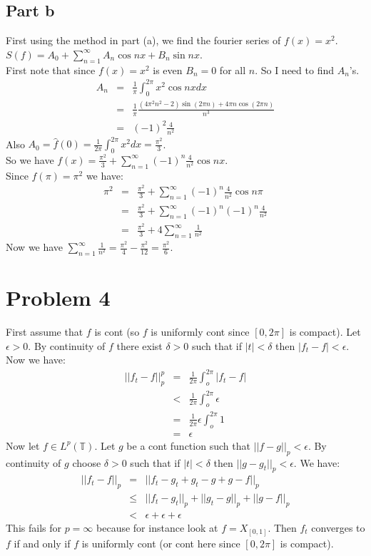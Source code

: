 \documentclass[12pt]{article}
\begin{document}
\subsection*{Part b}
First using the method in part (a), we find the fourier series of $f(x)=x^2$.\\
$S(f)=A_0+\sum_{n=1}^{\infty}A_n\cos nx+ B_n\sin nx$.
\\
First note that since $f(x)=x^2$ is even $B_n=0$ for all $n$.
So I need to find $A_n$'s. \\
\begin{eqnarray*}
A_n &=&\frac{1}{\pi}\int_0^{2\pi} x^2 \cos nx dx \\ &=&
\frac{1}{\pi} \frac{(4\pi^2n^2-2)\sin (2\pi n)+4\pi n\cos (2\pi n)}{n^3} \\ &=&(-1)^2 \frac{4}{n^2}
\end{eqnarray*}
Also $A_0=\hat{f}(0)=\frac{1}{2\pi}\int_0^{2\pi} x^2dx=\frac{ \pi^2}{3}$. \\
So we have $f(x)=\frac{ \pi^2}{3}+\sum_{n=1}^{\infty} (-1)^n\frac{4}{n^2}\cos nx$.\\
Since $f(\pi)=\pi^2$ we have:
\begin{eqnarray*}
\pi^2 &=& \frac{ \pi^2}{3}+\sum_{n=1}^{\infty} (-1)^n\frac{4}{n^2}\cos n\pi
\\ &=&
 \frac{ \pi^2}{3}+\sum_{n=1}^{\infty} (-1)^n(-1)^n\frac{4}{n^2}\\&=&
  \frac{ \pi^2}{3}+4\sum_{n=1}^{\infty} \frac{1}{n^2}
\end{eqnarray*}
Now we have $\sum_{n=1}^{\infty} \frac{1}{n^2}=\frac{\pi^2}{4}-\frac{\pi^2}{12}=\frac{\pi^2}{6}$.

\clearpage
\section*{Problem 4}
First assume that $f$ is cont (so $f$ is uniformly cont since $[0,2\pi]$ is compact). Let $\epsilon > 0$. By continuity of $f$ there exist
$\delta >0$ such that if $|t| < \delta$ then $|f_t-f|< \epsilon$. Now we have:
\begin{eqnarray*}
||f_t-f||_p^p &=& \frac{1}{2\pi}\int_o^{2\pi} |f_t-f|\\ &<&
\frac{1}{2\pi} \int_o^{2\pi} \epsilon \\ &=&
\frac{1}{2\pi} \epsilon \int_o^{2\pi}  1 \\&=& \epsilon
\end{eqnarray*}
Now let $f \in L^p(\mathbb{T})$. Let $g$ be a cont function such that $||f-g||_p < \epsilon$. By continuity of $g$ choose $\delta >0$ such that if $|t|<\delta$ then $||g-g_t||_p < \epsilon$. We have:
\begin{eqnarray*}
||f_t-f||_p &=& ||f_t-g_t+g_t-g+g-f||_p \\ &\le &
||f_t-g_t||_p+||g_t-g||_p+||g-f||_p \\ &<&
\epsilon +\epsilon +\epsilon
\end{eqnarray*}
This fails for $p=\infty$ because for instance look at $f=X_{[0,1]}$. Then $f_t$ converges to $f$ if and only if $f$ is uniformly cont (or cont here since $[0,2\pi]$ is compact). 
\end{document}
